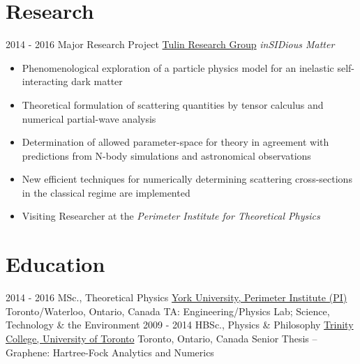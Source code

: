 \documentclass[letterpaper]{twentysecondcv} %
\begin{document}
\section{Research}
\begin{twenty}
	\twentyitem
    	{2014 - 2016}
        {Major Research Project}
        {\href{http://www.yorku.ca/stulin/research.html}{Tulin Research Group}}
        {\emph{inSIDious Matter}}
        {
        {\begin{itemize}
        \item Phenomenological exploration of a particle physics model for an inelastic self-interacting dark matter 
        \item Theoretical formulation of scattering quantities by tensor calculus and numerical partial-wave analysis
        \item Determination of allowed parameter-space for theory in agreement with predictions from N-body simulations and astronomical observations
       	\item New efficient techniques for numerically determining scattering cross-sections in the classical regime are implemented
    	\item Visiting Researcher at the \emph{Perimeter Institute for Theoretical Physics}
    \end{itemize}}

        }
\end{twenty}

\vfill

\section{Education}

\begin{twenty} %
	\twentyitem
    	{2014 - 2016}
        {MSc., Theoretical Physics}
        {\href{http://www.yorku.ca/}{York University, Perimeter Institute (PI)}}
        {Toronto/Waterloo, Ontario, Canada}
        {TA: Engineering/Physics Lab; Science, Technology \& the Environment}
	\twentyitem
    	{2009 - 2014}
        {HBSc., Physics \& Philosophy}
        {\href{https://www.utoronto.ca/}{Trinity College, University of Toronto}}
        {Toronto, Ontario, Canada}
        {Senior Thesis -- Graphene: Hartree-Fock Analytics and Numerics}
\end{twenty}
\end{document}

